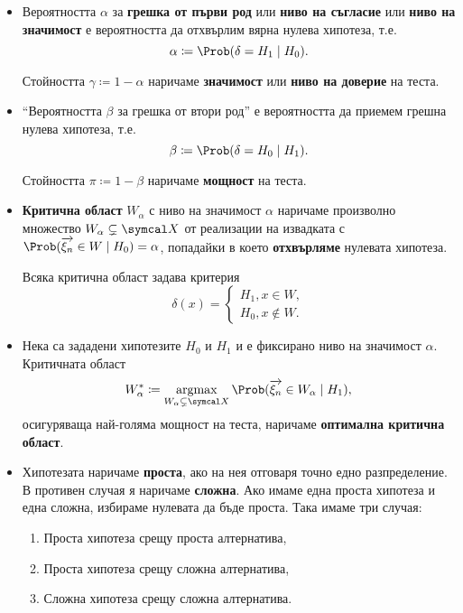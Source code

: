 \documentclass[
  numbers=endperiod,
  headings=standardclasses,
  bibliography=totocnumbered,
]{scrartcl}
\begin{document}
\begin{definition}[Хипотези]
\begin{itemize}
    \item Вероятността \( \alpha \) за \textbf{грешка от първи род} или \textbf{ниво на съгласие} или \textbf{ниво на значимост} е вероятността да отхвърлим вярна нулева хипотеза, т.е.
    \begin{equation*}
      \alpha \coloneqq \Prob(\delta = H_1 \mid H_0).
    \end{equation*}

    Стойността \( \gamma \coloneqq 1 - \alpha \) наричаме \textbf{значимост} или \textbf{ниво на доверие} на теста.

    \item \enquote{Вероятността \( \beta \) за грешка от втори род} е вероятността да приемем грешна нулева хипотеза, т.е.
    \begin{equation*}
      \beta \coloneqq \Prob(\delta = H_0 \mid H_1).
    \end{equation*}

    Стойността \( \pi \coloneqq 1 - \beta \) наричаме \textbf{мощност} на теста.

    \item \textbf{Критична област} \( W_\alpha \) с ниво на значимост \( \alpha \) наричаме произволно множество \( W_\alpha \subsetneq \SampleSpace \) от реализации на извадката с \( \Prob(\V{\xi_n} \in W \mid H_0) = \alpha \), попадайки в което \textbf{отхвърляме} нулевата хипотеза.

    Всяка критична област задава критерия
    \begin{equation*}
      \delta(x) = \begin{cases}
        H_1, x \in W, \\
        H_0, x \not\in W.
      \end{cases}
    \end{equation*}

    \item Нека са зададени хипотезите \( H_0 \) и \( H_1 \) и е фиксирано ниво на значимост \( \alpha \). Критичната област
    \begin{equation*}
      W_\alpha^* \coloneqq \Argmax_{W_\alpha \subsetneq \SampleSpace} \Prob(\V{\xi_n} \in W_\alpha \mid H_1),
    \end{equation*}
    осигуряваща най-голяма мощност на теста, наричаме \textbf{оптимална критична област}.

    \item Хипотезата наричаме \textbf{проста}, ако на нея отговаря точно едно разпределение. В противен случая я наричаме \textbf{сложна}. Ако имаме една проста хипотеза и една сложна, избираме нулевата да бъде проста. Така имаме три случая:
    \begin{enumerate}
      \item Проста хипотеза срещу проста алтернатива,
      \item Проста хипотеза срещу сложна алтернатива,
      \item Сложна хипотеза срещу сложна алтернатива.
    \end{enumerate}


\end{itemize}
\end{definition}
\end{document}
